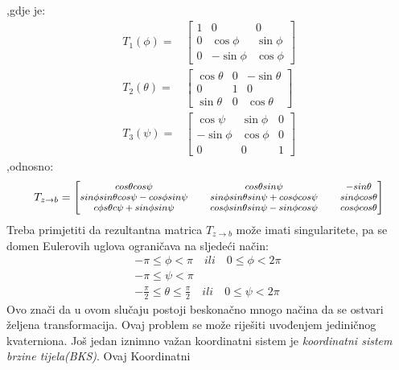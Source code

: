 ,gdje je:
\begin{align}
    T_1(\phi) =& \begin{bmatrix}
        1 & 0 & 0\\
        0 & \cos\phi & \sin\phi \\
        0 & -\sin\phi & \cos\phi 
    \end{bmatrix}\\
     T_2(\theta)=& \begin{bmatrix}
        \cos\theta & 0 & -\sin\theta \\
         0 & 1 & 0\\
         \sin\theta & 0 & \cos\theta
    \end{bmatrix}\\
    T_3(\psi) = &\begin{bmatrix}
        \cos\psi & \sin\phi & 0\\
        -\sin\phi & \cos\phi & 0\\
        0 & 0 & 1
    \end{bmatrix}
\end{align}
,odnosno:
\begin{equation}
    {\footnotesize
    T_{z \to b}=\begin{bmatrix}
        cos\theta cos\psi && cos\theta sin\psi && -sin\theta\\
        sin\phi sin\theta cos\psi-cos\phi sin\psi && sin\phi sin\theta sin\psi +cos\phi cos\psi&& sin\phi cos\theta\\
        c\phi s\theta c\psi+sin\phi sin\psi && cos\phi sin\theta sin\psi -sin\phi cos\psi&& cos\phi cos\theta\\
    \end{bmatrix}}
    \label{eq:ztob}
\end{equation}
Treba primjetiti da rezultantna matrica $T_{z \to b}$ može imati singularitete, pa se domen
Eulerovih uglova ograničava na sljedeći način:
\begin{align*}
    -\pi \leq \phi <\pi \quad ili \quad 0\leq\phi<2\pi \\
    -\pi \leq \psi <\pi \qquad \qquad \qquad \qquad \\
    -\frac{\pi}{2}\leq \theta \leq \frac{\pi}{2} \quad ili \quad 0\leq\psi<2\pi
\end{align*}
Ovo znači da u ovom slučaju postoji beskonačno mnogo načina da se ostvari željena transformacija.
Ovaj problem se može riješiti uvođenjem jediničnog kvaterniona.
Još jedan iznimno važan koordinatni sistem je \textit{koordinatni sistem brzine tijela(BKS)}. Ovaj Koordinatni
